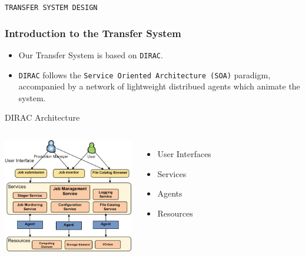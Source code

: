 \begin{frame}
    \begin{center}
        \LARGE \tt{TRANSFER SYSTEM DESIGN}
    \end{center}
\end{frame}

\begin{frame}
    \frametitle{Introduction to the Transfer System}
    \begin{itemize}
        \item Our Transfer System is based on {\tt DIRAC}. %
        \item {\tt DIRAC} follows the {\tt Service Oriented Architecture (SOA)}
                paradigm, accompanied by a network of lightweight distribued
                agents which animate the system.
    \end{itemize}
    \begin{block}{DIRAC Architecture}
        \begin{columns}
                \includegraphics[height=5cm,keepaspectratio]{data/DIRAC_Architecture.png}
                \begin{itemize}
                    \item User Interfaces
                    \item Services
                    \item Agents
                    \item Resources
                \end{itemize}
        \end{columns}
    \end{block}
\end{frame}


